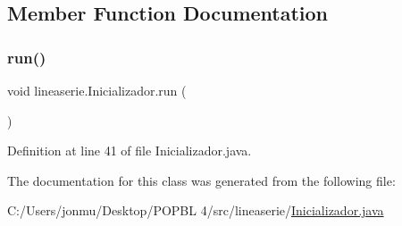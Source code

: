 \subsection{Member Function Documentation}
\mbox{\label{classlineaserie_1_1_inicializador_a8163b9059ff9417835aae96eddd8464a}} 
\subsubsection{\texorpdfstring{run()}{run()}}
{\footnotesize\ttfamily void lineaserie.\+Inicializador.\+run (\begin{DoxyParamCaption}{ }\end{DoxyParamCaption})}



Definition at line 41 of file Inicializador.\+java.



The documentation for this class was generated from the following file\+:\begin{DoxyCompactItemize}
\item 
C\+:/\+Users/jonmu/\+Desktop/\+P\+O\+P\+B\+L 4/src/lineaserie/\mbox{\hyperlink{_inicializador_8java}{Inicializador.\+java}}\end{DoxyCompactItemize}
